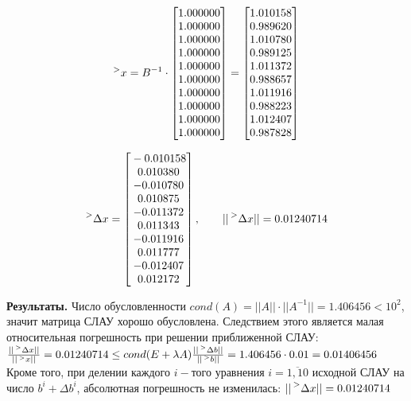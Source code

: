 \documentclass[14pt,a4paper]{scrartcl}
\begin{document}
\begin{equation*}
	\prescript{>}{}{x} = B^{-1} \cdot 
	\begin{bmatrix}{}
	1.000000 \\ 
	1.000000 \\ 
	1.000000 \\ 
	1.000000 \\ 
	1.000000 \\ 
	1.000000 \\ 
	1.000000 \\ 
	1.000000 \\ 
	1.000000 \\ 
	1.000000 \\ 
	\end{bmatrix}
	= 
	\begin{bmatrix}{}
	1.010158 \\ 
	0.989620 \\ 
	1.010780 \\ 
	0.989125 \\ 
	1.011372 \\ 
	0.988657 \\ 
	1.011916 \\ 
	0.988223 \\ 
	1.012407 \\ 
	0.987828 \\ 
	\end{bmatrix}
\end{equation*}

\begin{equation*}
	\prescript{>}{}{\Delta x} = 
	\begin{bmatrix}{}
	-0.010158 \\ 
	0.010380 \\ 
	-0.010780 \\ 
	0.010875 \\ 
	-0.011372 \\ 
	0.011343 \\ 
	-0.011916 \\ 
	0.011777 \\ 
	-0.012407 \\ 
	0.012172 \\ 
	\end{bmatrix},
	\qquad ||\prescript{>}{}{\Delta x}|| = 0.01240714
\end{equation*}

\textbf{Результаты.}
Число обусловленности $cond(A) = ||A|| \cdot ||A^{-1}|| = 1.406456 < 10^2$, значит матрица СЛАУ хорошо обусловлена. Следствием этого является малая относительная погрешность при решении приближенной СЛАУ:\\
 $\frac{|| \prescript{>}{}{\Delta x} ||}{|| \prescript{>}{}{x} ||} = 0.01240714 \leq cond(E + \lambda A) \frac{||\prescript{>}{}{\Delta b}||}{||\prescript{>}{}{b}||} = 1.406456 \cdot 0.01 = 0.01406456$
Кроме того, при делении каждого $i-$того уравнения $i=\overline{1,10}$ исходной СЛАУ на число $b^i + \Delta b^i$, абсолютная погрешность не изменилась: $||\prescript{>}{}{\Delta x}|| = 0.01240714$
\end{document}
